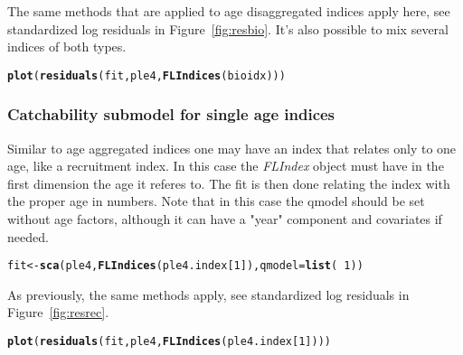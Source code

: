 \documentclass[a4paper,english,10pt]{article}\usepackage[]{graphicx}\usepackage[]{color}
\makeatletter
\newcommand{\hlnum}[1]{\textcolor[rgb]{0.686,0.059,0.569}{#1}}%
\newcommand{\hlopt}[1]{\textcolor[rgb]{0,0,0}{#1}}%
\newcommand{\hlstd}[1]{\textcolor[rgb]{0.345,0.345,0.345}{#1}}%
\newcommand{\hlkwb}[1]{\textcolor[rgb]{0.69,0.353,0.396}{#1}}%
\newcommand{\hlkwc}[1]{\textcolor[rgb]{0.333,0.667,0.333}{#1}}%
\newcommand{\hlkwd}[1]{\textcolor[rgb]{0.737,0.353,0.396}{\textbf{#1}}}%
\newenvironment{kframe}{%
 \def\at@end@of@kframe{}%
 \ifinner\ifhmode%
  \def\at@end@of@kframe{\end{minipage}}%
  \begin{minipage}{\columnwidth}%
 \fi\fi%
 \def\FrameCommand##1{\hskip\@totalleftmargin \hskip-\fboxsep
 \colorbox{shadecolor}{##1}\hskip-\fboxsep
     \hskip-\linewidth \hskip-\@totalleftmargin \hskip\columnwidth}%
 \MakeFramed {\advance\hsize-\width
   \@totalleftmargin\z@ \linewidth\hsize
   \@setminipage}}%
 {\par\unskip\endMakeFramed%
 \at@end@of@kframe}
\newenvironment{knitrout}{}{} %
\newcommand{\class}[1]{{\textit{#1}}}
\makeatother
\begin{document}
The same methods that are applied to age disaggregated indices apply here, see standardized log residuals in Figure~\ref{fig:resbio}. It's also possible to mix several indices of both types.

\begin{knitrout}
\color{fgcolor}\begin{kframe}
\begin{alltt}
\hlkwd{plot}\hlstd{(}\hlkwd{residuals}\hlstd{(fit, ple4,} \hlkwd{FLIndices}\hlstd{(bioidx)))}
\end{alltt}


{\ttfamily\noindent\bfseries\color{errorcolor}{\#\# Error: object 'fit' not found}}\end{kframe}
\end{knitrout}

\subsubsection{Catchability submodel for single age indices}

Similar to age aggregated indices one may have an index that relates only to one age, like a recruitment index. In this case the \class{FLIndex} object must have in the first dimension the age it referes to. The fit is then done relating the index with the proper age in numbers. Note that in this case the qmodel should be set without age factors, although it can have a "year" component and covariates if needed.

\begin{knitrout}
\color{fgcolor}\begin{kframe}
\begin{alltt}
\hlstd{fit} \hlkwb{<-} \hlkwd{sca}\hlstd{(ple4,} \hlkwd{FLIndices}\hlstd{(ple4.index[}\hlnum{1}\hlstd{]),} \hlkwc{qmodel}\hlstd{=}\hlkwd{list}\hlstd{(}\hlopt{~}\hlnum{1}\hlstd{))}
\end{alltt}


{\ttfamily\noindent\bfseries{}}\end{kframe}
\end{knitrout}

As previously, the same methods apply, see standardized log residuals in Figure~\ref{fig:resrec}.

\begin{knitrout}
\color{fgcolor}\begin{kframe}
\begin{alltt}
\hlkwd{plot}\hlstd{(}\hlkwd{residuals}\hlstd{(fit, ple4,} \hlkwd{FLIndices}\hlstd{(ple4.index[}\hlnum{1}\hlstd{])))}
\end{alltt}


{\ttfamily\noindent\bfseries\color{errorcolor}{\#\# Error: object 'fit' not found}}\end{kframe}
\end{knitrout}
\end{document}
